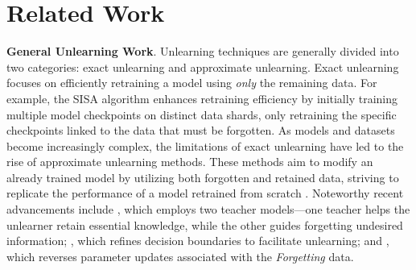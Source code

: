 \section{Related Work}


\textbf{General Unlearning Work}. Unlearning techniques are generally divided into two categories: exact unlearning and approximate unlearning. Exact unlearning focuses on efficiently retraining a model using \textit{only} the remaining data. For example, the SISA algorithm \citep{bourtoule2021machine} enhances retraining efficiency by initially training multiple model checkpoints on distinct data shards, only retraining the specific checkpoints linked to the data that must be forgotten. As models and datasets become increasingly complex, the limitations of exact unlearning have led to the rise of approximate unlearning methods. These methods aim to modify an already trained model by utilizing both forgotten and retained data, striving to replicate the performance of a model retrained from scratch \citep{nguyen2020variational, golatkar2020forgetting, golatkar2020eternal, liu2021federaser, thudi2022unrolling, chen2023boundary, tarun2023fast, chundawat2023can, kurmanji2024towards}. Noteworthy recent advancements include \citet{chundawat2023can}, which employs two teacher models—one teacher helps the unlearner retain essential knowledge, while the other guides forgetting undesired information; \citet{chen2023boundary}, which refines decision boundaries to facilitate unlearning; and \citet{thudi2022unrolling}, which reverses parameter updates associated with the \textit{Forgetting} data.

